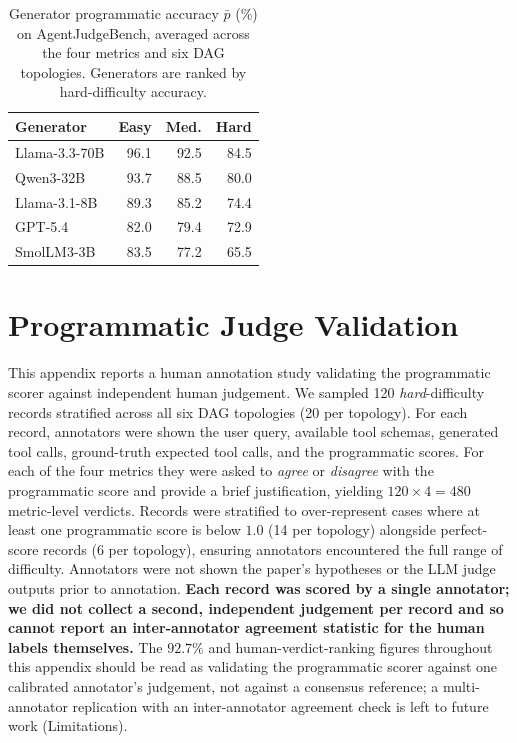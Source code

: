 \begin{table}[!htbp]
\centering
\small
\setlength{\tabcolsep}{4.5pt}
\renewcommand{\arraystretch}{1.05}
\begin{tabular}{@{}lrrr@{}}
\toprule
\textbf{Generator} & \textbf{Easy} & \textbf{Med.} & \textbf{Hard} \\
\midrule
Llama-3.3-70B & 96.1 & 92.5 & 84.5 \\
Qwen3-32B     & 93.7 & 88.5 & 80.0 \\
Llama-3.1-8B  & 89.3 & 85.2 & 74.4 \\
GPT-5.4       & 82.0 & 79.4 & 72.9 \\
SmolLM3-3B    & 83.5 & 77.2 & 65.5 \\
\bottomrule
\end{tabular}
\caption{Generator programmatic accuracy $\bar{p}$ (\%) on AgentJudgeBench, averaged across the four metrics and six DAG topologies. Generators are ranked by hard-difficulty accuracy.}
\label{tab:generator-accuracy}

\end{table}

\section{Programmatic Judge Validation}
\label{app:prog-judge-validation}

This appendix reports a human annotation study validating the programmatic scorer against independent human judgement. We sampled 120 \emph{hard}-difficulty records stratified across all six DAG topologies (20 per topology). For each record, annotators were shown the user query, available tool schemas, generated tool calls, ground-truth expected tool calls, and the programmatic scores. For each of the four metrics they were asked to \emph{agree} or \emph{disagree} with the programmatic score and provide a brief justification, yielding $120 \times 4 = 480$ metric-level verdicts. Records were stratified to over-represent cases where at least one programmatic score is below $1.0$ (14 per topology) alongside perfect-score records (6 per topology), ensuring annotators encountered the full range of difficulty. Annotators were not shown the paper's hypotheses or the LLM judge outputs prior to annotation. \textbf{Each record was scored by a single annotator; we did not collect a second, independent judgement per record and so cannot report an inter-annotator agreement statistic for the human labels themselves.} The $92.7\%$ and human-verdict-ranking figures throughout this appendix should be read as validating the programmatic scorer against one calibrated annotator's judgement, not against a consensus reference; a multi-annotator replication with an inter-annotator agreement check is left to future work (Limitations).

